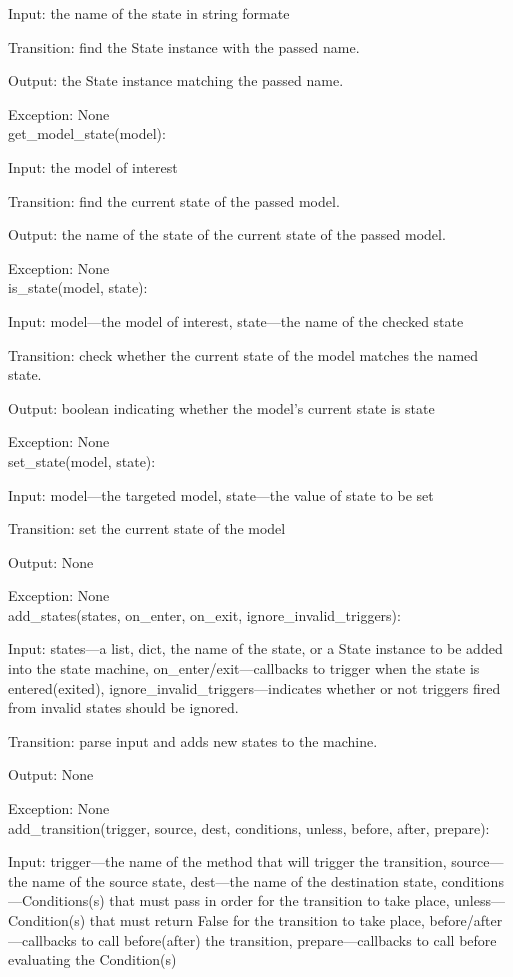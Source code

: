 \documentclass[12pt,titlepage]{article}
\begin{document}
Input: the name of the state in string formate

Transition: find the State instance with the passed name.

Output: the State instance matching the passed name.

Exception: None \\
get\_model\_state(model):

Input: the model of interest

Transition: find the current state of the passed model.

Output: the name of the state of the current state of the passed model.

Exception: None \\
is\_state(model, state):

Input: model---the model of interest, state---the name of the checked state

Transition: check whether the current state of the model matches the named
state.

Output: boolean indicating whether the model's current state is state

Exception: None\\
set\_state(model, state):

Input: model---the targeted model, state---the value of state to be set

Transition: set the current state of the model

Output: None

Exception: None\\
add\_states(states, on\_enter, on\_exit, ignore\_invalid\_triggers):

Input: states---a list, dict, the name of the state, or a State instance to be
added into the state machine, on\_enter/exit---callbacks to trigger when the
state is entered(exited), ignore\_invalid\_triggers---indicates whether or not
triggers fired from invalid states should be ignored.

Transition: parse input and adds new states to the machine.

Output: None

Exception: None \\
add\_transition(trigger, source, dest, conditions, unless, before, after,
prepare):

Input: trigger---the name of the method that will trigger the transition,
source---the name of the source state, dest---the name of the destination state,
conditions---Conditions(s) that must pass in order for the transition to take
place, unless---Condition(s) that must return False for the transition to take
place, before/after---callbacks to call before(after) the transition,
prepare---callbacks to call before evaluating the Condition(s)
\end{document}

